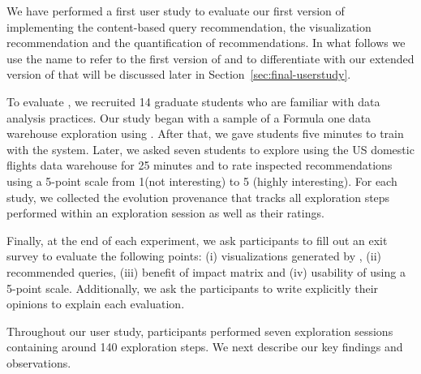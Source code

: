 \label{eval-evlin+}


We have performed a first user study to evaluate our first version of \prototype{} implementing the content-based query recommendation, the visualization recommendation and the quantification of recommendations.
{\color{Fuchsia}In what follows we use the name \prototypeOne{} to refer to the first version of \prototype{}  and to differentiate with our extended version of \prototype{} that will be discussed later in Section~\ref{sec:final-userstudy}.}




To evaluate \prototypeOne{}, we recruited 14 graduate students who are familiar with data analysis practices.
Our study began with a sample of a Formula one data warehouse exploration using \prototypeOne{}. After that, we gave students five minutes to train with the system.
Later, we asked seven students to explore using \prototypeOne{} the US domestic flights data warehouse for 25 minutes and to rate inspected recommendations using a 5-point scale from 1(not interesting) to 5 (highly interesting).
For each study, we collected the evolution provenance that tracks all exploration steps performed within  an exploration session as well as their ratings. 

Finally, at the end of each experiment, we ask participants to fill out an exit survey to evaluate the following points: (i) visualizations generated by \prototypeOne{}, (ii) recommended queries, (iii) benefit of impact matrix and (iv) usability of \prototypeOne{} using a 5-point scale. Additionally, we ask the participants to write explicitly their opinions to explain each evaluation.



	  \begin{table}[b]
 \centering
 \scriptsize
 \caption{Average ratings for each participant in the user study}
 \label{tab:avg-rating}
 \end{table}
Throughout our user study, participants performed seven exploration sessions containing around 140 exploration steps. We next describe our key findings and observations.


